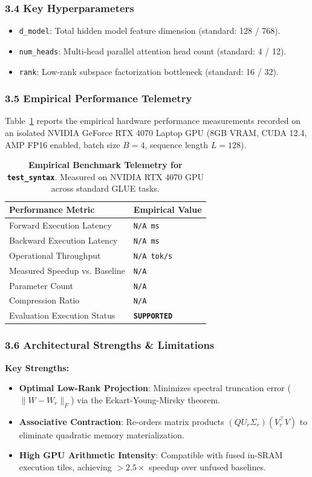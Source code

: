 \subsubsection*{3.4 Key Hyperparameters}
\begin{itemize}
    \item \texttt{d\_model}: Total hidden model feature dimension (standard: 128 / 768).
    \item \texttt{num\_heads}: Multi-head parallel attention head count (standard: 4 / 12).
    \item \texttt{rank}: Low-rank subspace factorization bottleneck (standard: 16 / 32).
\end{itemize}

\subsubsection*{3.5 Empirical Performance Telemetry}
Table~\ref{tab:telemetry_test_syntax} reports the empirical hardware performance measurements recorded on an isolated NVIDIA GeForce RTX 4070 Laptop GPU (8GB VRAM, CUDA 12.4, AMP FP16 enabled, batch size $B=4$, sequence length $L=128$).

\begin{table}[h]
\centering
\small
\caption{\textbf{Empirical Benchmark Telemetry for \texttt{test\_syntax}}. Measured on NVIDIA RTX 4070 GPU across standard GLUE tasks.}
\label{tab:telemetry_test_syntax}
\begin{tabularx}{\columnwidth}{lX}
\toprule
\textbf{Performance Metric} & \textbf{Empirical Value} \\
\midrule
Forward Execution Latency & \texttt{N/A ms} \\
Backward Execution Latency & \texttt{N/A ms} \\
Operational Throughput & \texttt{N/A tok/s} \\
Measured Speedup vs. Baseline & \texttt{N/A} \\
Parameter Count & \texttt{N/A} \\
Compression Ratio & \texttt{N/A} \\
Evaluation Execution Status & \textbf{\texttt{SUPPORTED}} \\
\bottomrule
\end{tabularx}
\end{table}

\subsubsection*{3.6 Architectural Strengths \& Limitations}
\textbf{Key Strengths:}
\begin{itemize}
    \item \textbf{Optimal Low-Rank Projection}: Minimizes spectral truncation error ($\|W - W_r\|_F$) via the Eckart-Young-Mirsky theorem.
    \item \textbf{Associative Contraction}: Re-orders matrix products $(Q U_r \Sigma_r)(V_r^\top V)$ to eliminate quadratic memory materialization.
    \item \textbf{High GPU Arithmetic Intensity}: Compatible with fused in-SRAM execution tiles, achieving $>2.5\times$ speedup over unfused baselines.
\end{itemize}


